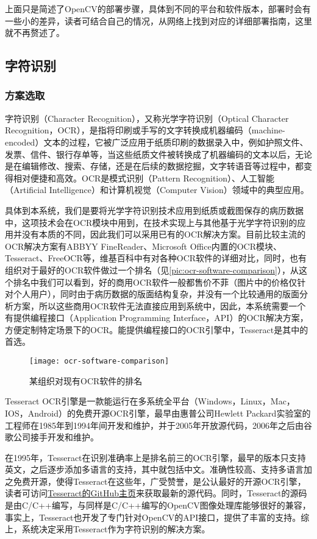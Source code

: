 上面只是简述了OpenCV的部署步骤，具体到不同的平台和软件版本，部署时会有一些小的差异，读者可结合自己的情况，从网络上找到对应的详细部署指南，这里就不再赘述了。

\subsection{字符识别}
\subsubsection*{方案选取}
字符识别（Character Recognition），又称光学字符识别（Optical Character Recognition，OCR），是指将印刷或手写的文字转换成机器编码（machine-encoded）文本的过程，它被广泛应用于纸质印刷的数据录入中，例如护照文件、发票、信件、银行存单等，当这些纸质文件被转换成了机器编码的文本以后，无论是在编辑修改、搜索、存储，还是在后续的数据挖掘，文字转语音等过程中，都变得相对便捷和高效。OCR是模式识别（Pattern Recognition）、人工智能（Artificial Intelligence）和计算机视觉（Computer Vision）领域中的典型应用\citep{wiki:OCR}。

具体到本系统，我们是要将光学字符识别技术应用到纸质或截图保存的病历数据中，这项技术会在OCR模块中用到，在技术实现上与其他基于光学字符识别的应用并没有本质的不同，因此我们可以采用已有的OCR解决方案。目前比较主流的OCR解决方案有ABBYY FineReader、Microsoft Office内置的OCR模块、Tesseract、FreeOCR等，维基百科中有对各种OCR软件的详细对比\citep{wiki:OCRcomparison}，同时，也有组织对于最好的OCR软件做过一个排名（见\autoref{pic:ocr-software-comparison}），从这个排名中我们可以看到，好的商用OCR软件一般都售价不菲（图片中的价格仅针对个人用户），同时由于病历数据的版面结构复杂，并没有一个比较通用的版面分析方案，所以这些商用OCR软件无法直接应用到系统中，因此，本系统需要一个有提供编程接口（Application Programming Interface，API）的OCR解决方案，方便定制特定场景下的OCR。能提供编程接口的OCR引擎中，Tesseract是其中的首选。

\begin{figure}[htbp]
	\centering
	\caption{某组织对现有OCR软件的排名}
	\texttt{[image: ocr-software-comparison]}
	\label{pic:ocr-software-comparison}
\end{figure}

Tesseract OCR引擎是一款能运行在多系统全平台（Windows，Linux，Mac，IOS，Android）的免费开源OCR引擎，最早由惠普公司Hewlett Packard实验室的工程师在1985年到1994年间开发和维护，并于2005年开放源代码，2006年之后由谷歌公司接手开发和维护\citep{wiki:Tesseract}。

在1995年，Tesseract在识别准确率上是排名前三的OCR引擎，最早的版本只支持英文，之后逐步添加多语言的支持，其中就包括中文。准确性较高、支持多语言加之免费开源，使得Tesseract在这些年，广受赞誉，是公认最好的开源OCR引擎，读者可访问\href{https://github.com/tesseract-ocr/tesseract}{Tesseract的GitHub主页}来获取最新的源代码。同时，Tesseract的源码是由C/C++编写，与同样是C/C++编写的OpenCV图像处理库能够很好的兼容，事实上，Tesseract也开发了专门针对OpenCV的API接口，提供了丰富的支持。综上，系统决定采用Tesseract作为字符识别的解决方案。

